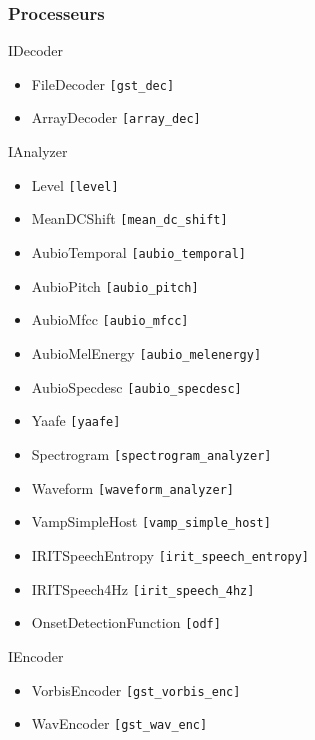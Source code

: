 \documentclass[10pt, final, hyperref, table]{beamer}
\begin{document}
\begin{frame}\tiny
  \frametitle{Processeurs}
  \begin{minipage}{0.45\linewidth}

   \begin{block}{IDecoder}
      \begin{itemize}
      \item FileDecoder \texttt{[gst\_dec]}
      \item \alert{ArrayDecoder} \texttt{[array\_dec]}
      \end{itemize}
    \end{block}
    \begin{block}{IAnalyzer}
      \begin{itemize}
      \item Level \texttt{[level]}
      \item MeanDCShift \texttt{[mean\_dc\_shift]}
      \item AubioTemporal \texttt{[aubio\_temporal]}
      \item AubioPitch \texttt{[aubio\_pitch]}
      \item AubioMfcc \texttt{[aubio\_mfcc]}
        \item AubioMelEnergy \texttt{[aubio\_melenergy]}
      \item AubioSpecdesc \texttt{[aubio\_specdesc]}
      \item \alert{Yaafe} \texttt{[yaafe]}
      \item \alert{Spectrogram} \texttt{[spectrogram\_analyzer]}
      \item \alert{Waveform} \texttt{[waveform\_analyzer]}
      \item \alert{VampSimpleHost} \texttt{[vamp\_simple\_host]}
      \item \alert{IRITSpeechEntropy} \texttt{[irit\_speech\_entropy]}
      \item \alert{IRITSpeech4Hz} \texttt{[irit\_speech\_4hz]}
      \item \alert{OnsetDetectionFunction} \texttt{[odf]}
      \end{itemize}
    \end{block}
   \end{minipage} \hfill
   \begin{minipage}{0.5\linewidth}
      \begin{block}{IEncoder}
      \begin{itemize}
      \item VorbisEncoder \texttt{[gst\_vorbis\_enc]}
      \item WavEncoder \texttt{[gst\_wav\_enc]}

\end{itemize}
\end{block}
\end{minipage}
\end{frame}
\end{document}
